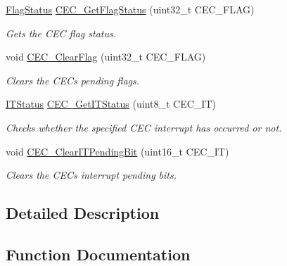\begin{DoxyCompactItemize}
\mbox{\hyperlink{group___exported__types_ga89136caac2e14c55151f527ac02daaff}{Flag\+Status}} \mbox{\hyperlink{group___c_e_c___exported___functions_gaf920706cb350182bf0728c66868053ca}{C\+E\+C\+\_\+\+Get\+Flag\+Status}} (uint32\+\_\+t C\+E\+C\+\_\+\+F\+L\+AG)
\begin{DoxyCompactList}\small\item\em Gets the C\+EC flag status. \end{DoxyCompactList}\item 
void \mbox{\hyperlink{group___c_e_c___exported___functions_ga928b373fb5972204c56f9c64113f8c67}{C\+E\+C\+\_\+\+Clear\+Flag}} (uint32\+\_\+t C\+E\+C\+\_\+\+F\+L\+AG)
\begin{DoxyCompactList}\small\item\em Clears the C\+EC\textquotesingle{}s pending flags. \end{DoxyCompactList}\item 
\mbox{\hyperlink{group___exported__types_gaacbd7ed539db0aacd973a0f6eca34074}{I\+T\+Status}} \mbox{\hyperlink{group___c_e_c___exported___functions_gaa1940a388d0bfcefe7483fb74cc2ba1d}{C\+E\+C\+\_\+\+Get\+I\+T\+Status}} (uint8\+\_\+t C\+E\+C\+\_\+\+IT)
\begin{DoxyCompactList}\small\item\em Checks whether the specified C\+EC interrupt has occurred or not. \end{DoxyCompactList}\item 
void \mbox{\hyperlink{group___c_e_c___exported___functions_gade646921262a077172c708953822f248}{C\+E\+C\+\_\+\+Clear\+I\+T\+Pending\+Bit}} (uint16\+\_\+t C\+E\+C\+\_\+\+IT)
\begin{DoxyCompactList}\small\item\em Clears the C\+EC\textquotesingle{}s interrupt pending bits. \end{DoxyCompactList}\end{DoxyCompactItemize}


\subsection{Detailed Description}


\subsection{Function Documentation}
\mbox{\label{group___c_e_c___exported___functions_ga928b373fb5972204c56f9c64113f8c67}} 
